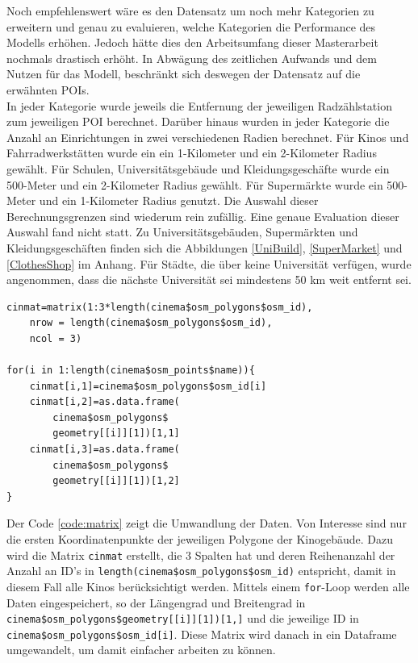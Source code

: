 \documentclass[a4paper,12pt]{thesis}
\begin{document}
Noch empfehlenswert wäre es den Datensatz um noch mehr Kategorien zu erweitern und genau zu evaluieren, welche Kategorien die Performance des Modells erhöhen. Jedoch hätte dies den Arbeitsumfang dieser Masterarbeit nochmals drastisch erhöht. In Abwägung des zeitlichen Aufwands und dem Nutzen für das Modell, beschränkt sich deswegen der Datensatz auf die erwähnten POIs.\\
In jeder Kategorie wurde jeweils die Entfernung der jeweiligen Radzählstation zum jeweiligen POI berechnet. Darüber hinaus wurden in jeder Kategorie die Anzahl an Einrichtungen in zwei verschiedenen Radien berechnet. Für Kinos und Fahrradwerkstätten wurde ein ein 1-Kilometer und ein 2-Kilometer Radius gewählt. Für Schulen, Universitätsgebäude und Kleidungsgeschäfte wurde ein 500-Meter und ein 2-Kilometer Radius gewählt. Für Supermärkte wurde ein 500-Meter und ein 1-Kilometer Radius genutzt. Die Auswahl dieser Berechnungsgrenzen sind wiederum rein zufällig. Eine genaue Evaluation dieser Auswahl fand nicht statt. Zu Universitätsgebäuden, Supermärkten und Kleidungsgeschäften finden sich die Abbildungen \ref{UniBuild}, \ref{SuperMarket} und \ref{ClothesShop} im Anhang. Für Städte, die über keine Universität verfügen, wurde angenommen, dass die nächste Universität sei mindestens 50 km weit entfernt sei.


\begin{minipage}{\linewidth}
\begin{lstlisting}[caption={Speichere die OSM Koordinaten},label=code:matrix]
cinmat=matrix(1:3*length(cinema$osm_polygons$osm_id), 
	nrow = length(cinema$osm_polygons$osm_id), 
	ncol = 3)
	
for(i in 1:length(cinema$osm_points$name)){
   	cinmat[i,1]=cinema$osm_polygons$osm_id[i]
	cinmat[i,2]=as.data.frame(
		cinema$osm_polygons$
		geometry[[i]][1])[1,1]
	cinmat[i,3]=as.data.frame(
		cinema$osm_polygons$
		geometry[[i]][1])[1,2]
}
\end{lstlisting}
\end{minipage}

Der Code \ref{code:matrix} zeigt die Umwandlung der Daten. Von Interesse sind nur die ersten Koordinatenpunkte der jeweiligen Polygone der Kinogebäude. Dazu wird die Matrix \lstinline|cinmat| erstellt, die 3 Spalten hat und deren Reihenanzahl der Anzahl an ID's in \lstinline|length(cinema$osm_polygons$osm_id)| entspricht, damit in diesem Fall alle Kinos berücksichtigt werden. Mittels einem \lstinline|for|-Loop werden alle Daten eingespeichert, so der Längengrad und Breitengrad in \lstinline|cinema$osm_polygons$geometry[[i]][1])[1,]| und die jeweilige ID in \lstinline|cinema$osm_polygons$osm_id[i]|. Diese Matrix wird danach in ein Dataframe umgewandelt, um damit einfacher arbeiten zu können.\\
\end{document}

